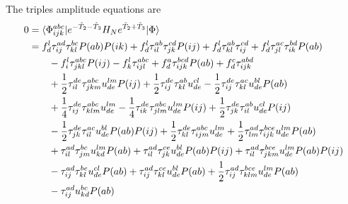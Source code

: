         The triples amplitude equations are
        \begin{align}
            0 & = \braslate{abc}{ijk} e^{-\clust_2 - \clust_3} \HN
            e^{\clust_2 + \clust_3}\ketslat
            \\
            &=
            f^{l}_{d} \clustamp^{ad}_{ij} \clustamp^{bc}_{kl} P(ab) P(ik)
            + f^{l}_{d} \clustamp^{ab}_{il} \clustamp^{cd}_{jk} P(ij)
            + f^{l}_{d} \clustamp^{ab}_{kl} \clustamp^{cd}_{ij}
            + f^{l}_{d} \clustamp^{ac}_{jl} \clustamp^{bd}_{ik} P(ab)
            \nonumber \\
            &\qquad
            - f^{l}_{i} \clustamp^{abc}_{jkl} P(ij)
            - f^{l}_{k} \clustamp^{abc}_{ijl}
            + f^{a}_{d} \clustamp^{bcd}_{ijk} P(ab)
            + f^{c}_{d} \clustamp^{abd}_{ijk}
            \nonumber \\
            &\qquad
            + \frac{1}{2} \clustamp^{de}_{il} \clustamp^{abc}_{jkm} u^{lm}_{de} P(ij)
            + \frac{1}{2} \clustamp^{de}_{ij} \clustamp^{ab}_{kl} u^{cl}_{de}
            - \frac{1}{2} \clustamp^{de}_{ij} \clustamp^{ac}_{kl} u^{bl}_{de} P(ab)
            \nonumber \\
            &\qquad
            + \frac{1}{4} \clustamp^{de}_{ij} \clustamp^{abc}_{klm} u^{lm}_{de}
            - \frac{1}{4} \clustamp^{de}_{ik} \clustamp^{abc}_{jlm} u^{lm}_{de} P(ij)
            + \frac{1}{2} \clustamp^{de}_{jk} \clustamp^{ab}_{il} u^{cl}_{de} P(ij)
            \nonumber \\
            &\qquad
            - \frac{1}{2} \clustamp^{de}_{jk} \clustamp^{ac}_{il} u^{bl}_{de} P(ab) P(ij)
            + \frac{1}{2} \clustamp^{de}_{kl} \clustamp^{abc}_{ijm} u^{lm}_{de}
            + \frac{1}{2} \clustamp^{ad}_{lm} \clustamp^{bce}_{ijk} u^{lm}_{de} P(ab)
            \nonumber \\
            &\qquad
            + \clustamp^{ad}_{il} \clustamp^{bc}_{jm} u^{lm}_{kd} P(ab)
            + \clustamp^{ad}_{il} \clustamp^{ce}_{jk} u^{bl}_{de} P(ab) P(ij)
            + \clustamp^{ad}_{il} \clustamp^{bce}_{jkm} u^{lm}_{de} P(ab) P(ij)
            \nonumber \\
            &\qquad
            - \clustamp^{ad}_{ij} \clustamp^{be}_{kl} u^{cl}_{de} P(ab)
            + \clustamp^{ad}_{ij} \clustamp^{ce}_{kl} u^{bl}_{de} P(ab)
            + \frac{1}{2} \clustamp^{ad}_{ij} \clustamp^{bce}_{klm} u^{lm}_{de} P(ab)
            \nonumber \\
            &\qquad
            - \clustamp^{ad}_{ij} u^{bc}_{kd} P(ab)

\end{align}
